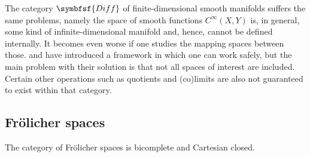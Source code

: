     The category $\symbfsf{Diff}$ of finite-dimensional smooth manifolds suffers the same problems, namely the space of smooth functions $C^\infty(X,Y)$ is, in general, some kind of infinite-dimensional manifold and, hence, cannot be defined internally. It becomes even worse if one studies the mapping spaces between those.  and  have introduced a framework in which one can work safely, but the main problem with their solution is that not all spaces of interest are included. Certain other operations such as quotients and (co)limits are also not guaranteed to exist within that category.

\subsection{Fr\"olicher spaces}


    \begin{property}
        The category of Fr\"olicher spaces is bicomplete and Cartesian closed.
    \end{property}

